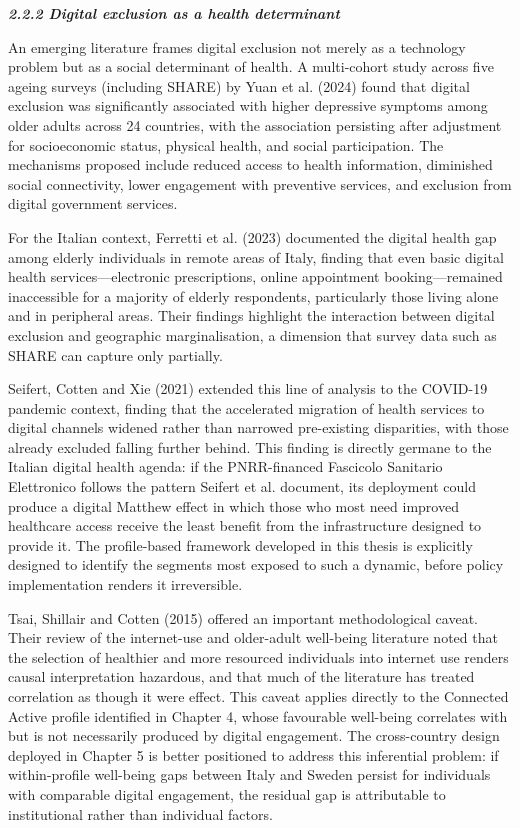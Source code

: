 \emph{\textbf{2.2.2 Digital exclusion as a health determinant}}

An emerging literature frames digital exclusion not merely as a technology problem but as a social determinant of health. A multi-cohort study across five ageing surveys (including SHARE) by Yuan et al. (2024) found that digital exclusion was significantly associated with higher depressive symptoms among older adults across 24 countries, with the association persisting after adjustment for socioeconomic status, physical health, and social participation. The mechanisms proposed include reduced access to health information, diminished social connectivity, lower engagement with preventive services, and exclusion from digital government services.

For the Italian context, Ferretti et al. (2023) documented the digital health gap among elderly individuals in remote areas of Italy, finding that even basic digital health services---electronic prescriptions, online appointment booking---remained inaccessible for a majority of elderly respondents, particularly those living alone and in peripheral areas. Their findings highlight the interaction between digital exclusion and geographic marginalisation, a dimension that survey data such as SHARE can capture only partially.

Seifert, Cotten and Xie (2021) extended this line of analysis to the COVID-19 pandemic context, finding that the accelerated migration of health services to digital channels widened rather than narrowed pre-existing disparities, with those already excluded falling further behind. This finding is directly germane to the Italian digital health agenda: if the PNRR-financed Fascicolo Sanitario Elettronico follows the pattern Seifert et al. document, its deployment could produce a digital Matthew effect in which those who most need improved healthcare access receive the least benefit from the infrastructure designed to provide it. The profile-based framework developed in this thesis is explicitly designed to identify the segments most exposed to such a dynamic, before policy implementation renders it irreversible.

Tsai, Shillair and Cotten (2015) offered an important methodological caveat. Their review of the internet-use and older-adult well-being literature noted that the selection of healthier and more resourced individuals into internet use renders causal interpretation hazardous, and that much of the literature has treated correlation as though it were effect. This caveat applies directly to the Connected Active profile identified in Chapter 4, whose favourable well-being correlates with but is not necessarily produced by digital engagement. The cross-country design deployed in Chapter 5 is better positioned to address this inferential problem: if within-profile well-being gaps between Italy and Sweden persist for individuals with comparable digital engagement, the residual gap is attributable to institutional rather than individual factors.

